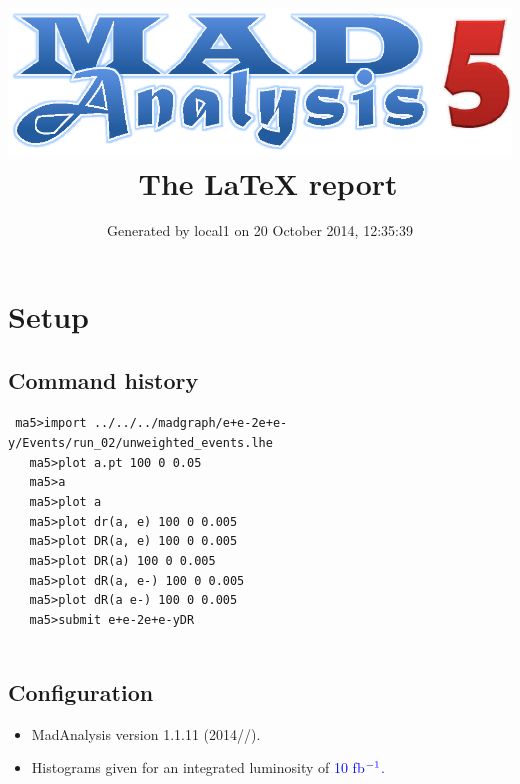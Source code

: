 \documentclass[a4paper, 11pt]{article}
\title{{\includegraphics[scale=.4]{logo.eps}}\ The LaTeX report}
\author{Generated by local1 on 20 October 2014, 12:35:39}
\begin{document}
\maketitle
\flushbottom

\newpage
\section{ Setup}

\subsection{ Command history}

\texttt{ ma5>import ../\-../\-../\-madgraph/\-e+e-2e+e-y/\-Events/\-run\_02/\-unweighted\_events.lhe\\
}
\texttt{ }\texttt{ }\texttt{ ma5>plot a.pt 100 0 0.05\\
}
\texttt{ }\texttt{ }\texttt{ ma5>a\\
}
\texttt{ }\texttt{ }\texttt{ ma5>plot a\\
}
\texttt{ }\texttt{ }\texttt{ ma5>plot dr(a, e) 100 0 0.005\\
}
\texttt{ }\texttt{ }\texttt{ ma5>plot DR(a, e) 100 0 0.005\\
}
\texttt{ }\texttt{ }\texttt{ ma5>plot DR(a) 100 0 0.005\\
}
\texttt{ }\texttt{ }\texttt{ ma5>plot dR(a, e-) 100 0 0.005\\
}
\texttt{ }\texttt{ }\texttt{ ma5>plot dR(a e-) 100 0 0.005\\
}
\texttt{ }\texttt{ }\texttt{ ma5>submit e+e-2e+e-yDR\\
}
\texttt{ }\texttt{ }\subsection{ Configuration}

\begin{itemize}
  \item MadAnalysis version 1.1.11 (2014//).
   \item Histograms given for an integrated luminosity of \textcolor{blue}{10}\textcolor{blue}{ fb}$^{\textcolor{blue}{-1}}$\textcolor{blue}{.}
\textcolor{blue}{}
\end{itemize}
\newpage
\end{document}
